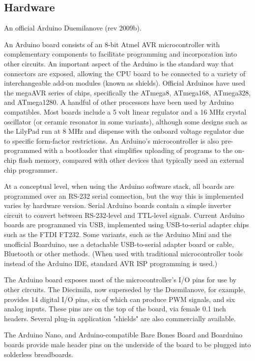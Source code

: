 \subsection{Hardware}

An official Arduino Duemilanove (rev 2009b).

An Arduino board consists of an 8-bit Atmel AVR microcontroller with complementary components to facilitate programming and incorporation into other circuits. An important aspect of the Arduino is the standard way that connectors are exposed, allowing the CPU board to be connected to a variety of interchangeable add-on modules (known as shields). Official Arduinos have used the megaAVR series of chips, specifically the ATmega8, ATmega168, ATmega328, and ATmega1280. A handful of other processors have been used by Arduino compatibles. Most boards include a 5 volt linear regulator and a 16 MHz crystal oscillator (or ceramic resonator in some variants), although some designs such as the LilyPad run at 8 MHz and dispense with the onboard voltage regulator due to specific form-factor restrictions. An Arduino's microcontroller is also pre-programmed with a bootloader that simplifies uploading of programs to the on-chip flash memory, compared with other devices that typically need an external chip programmer.

At a conceptual level, when using the Arduino software stack, all boards are programmed over an RS-232 serial connection, but the way this is implemented varies by hardware version. Serial Arduino boards contain a simple inverter circuit to convert between RS-232-level and TTL-level signals. Current Arduino boards are programmed via USB, implemented using USB-to-serial adapter chips such as the FTDI FT232. Some variants, such as the Arduino Mini and the unofficial Boarduino, use a detachable USB-to-serial adapter board or cable, Bluetooth or other methods. (When used with traditional microcontroller tools instead of the Arduino IDE, standard AVR ISP programming is used.)

The Arduino board exposes most of the microcontroller's I/O pins for use by other circuits. The Diecimila, now superseded by the Duemilanove, for example, provides 14 digital I/O pins, six of which can produce PWM signals, and six analog inputs. These pins are on the top of the board, via female 0.1 inch headers. Several plug-in application "shields" are also commercially available.

The Arduino Nano, and Arduino-compatible Bare Bones Board and Boarduino boards provide male header pins on the underside of the board to be plugged into solderless breadboards.

